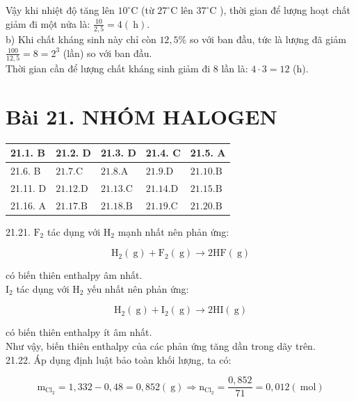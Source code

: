 \documentclass[10pt]{article}
\begin{document}
Vậy khi nhiệt độ tăng lên $10^{\circ} \mathrm{C}$ (từ $27^{\circ} \mathrm{C}$ lên $37^{\circ} \mathrm{C}$ ), thời gian để lượng hoạt chất giảm đi một nửa là: $\frac{10}{2,5}=4(\mathrm{~h})$.\\
b) Khi chất kháng sinh này chỉ còn $12,5 \%$ so với ban đầu, tức là lượng đã giảm $\frac{100}{12,5}=8=2^{3}$ (lần) so với ban đầu.\\
Thời gian cần để lượng chất kháng sinh giảm đi 8 lần là: $4 \cdot 3=12$ (h).

\section*{Bài 21. NHÓM HALOGEN}
\begin{center}
\begin{tabular}{|l|l|l|l|l|}
\hline
21.1. B & 21.2. D & 21.3. D & 21.4. C & 21.5. A \\
\hline
21.6. B & $21.7 . \mathrm{C}$ & $21.8 . \mathrm{A}$ & $21.9 . \mathrm{D}$ & $21.10 . \mathrm{B}$ \\
\hline
21.11. D & $21.12 . \mathrm{D}$ & $21.13 . \mathrm{C}$ & $21.14 . \mathrm{D}$ & $21.15 . \mathrm{B}$ \\
\hline
21.16. A & $21.17 . \mathrm{B}$ & $21.18 . \mathrm{B}$ & $21.19 . \mathrm{C}$ & $21.20 . \mathrm{B}$ \\
\hline
\end{tabular}
\end{center}

21.21. $\mathrm{F}_{2}$ tác dụng với $\mathrm{H}_{2}$ mạnh nhất nên phản ứng:

$$
\mathrm{H}_{2}(\mathrm{~g})+\mathrm{F}_{2}(\mathrm{~g}) \longrightarrow 2 \mathrm{HF}(\mathrm{~g})
$$

có biến thiên enthalpy âm nhất.\\
$\mathrm{I}_{2}$ tác dụng với $\mathrm{H}_{2}$ yếu nhất nên phản ứng:

$$
\mathrm{H}_{2}(\mathrm{~g})+\mathrm{I}_{2}(\mathrm{~g}) \longrightarrow 2 \mathrm{HI}(\mathrm{~g})
$$

có biến thiên enthalpy ít âm nhất.\\
Như vậy, biến thiên enthalpy của các phản ứng tăng dần trong dãy trên.\\
21.22. Áp dụng định luật bảo toàn khối lượng, ta có:

$$
\mathrm{m}_{\mathrm{Cl}_{2}}=1,332-0,48=0,852(\mathrm{~g}) \Rightarrow \mathrm{n}_{\mathrm{Cl}_{2}}=\frac{0,852}{71}=0,012(\mathrm{~mol})
$$
\end{document}

